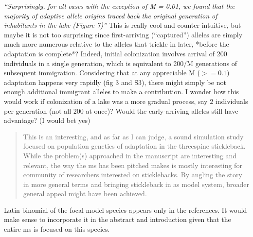 \begin{point}{\revref}
    \textit{``Surprisingly, for all cases with the exception of M = 0.01, we found that the
    majority of adaptive allele origins traced back the original generation of
    inhabitants in the lake (Figure 7)''}
    This is really cool and counter-intuitive,
    but maybe it is not too surprising since first-arriving (``captured'') alleles
    are simply much more numerous relative to the alleles that trickle in later,
    *before the adaptation is complete*? Indeed, initial colonization involves
    arrival of 200 individuals in a single generation, which is equivalent to 200/M
    generations of subsequent immigration. Considering that at any appreciable M
    ($>=0.1$) adaptation happens very rapidly (fig 3 and S3), there might simply be
    not enough additional immigrant alleles to make a contribution. I wonder how
    this would work if colonization of a lake was a more gradual process, say 2
    individuals per generation (not all 200 at once)? Would the early-arriving
    alleles still have advantage? (I would bet yes)
\end{point}




\begin{quote}
    This is an interesting, and as far as I can judge, a sound simulation study
    focused on population genetics of adaptation in the threespine stickleback.
    While the problem(s) approached in the manuscript are interesting and relevant,
    the way the ms has been pitched makes is mostly interesting for community of
    researchers interested on sticklebacks. By angling the story in more general
    terms and bringing stickleback in as model system, broader general appeal might
    have been achieved.
\end{quote}


\begin{point}{}
Latin binomial of the focal model species appears only in the references. It would make sense to incorporate it in the abstract and introduction given that the entire ms is focused on this species.
\end{point}

